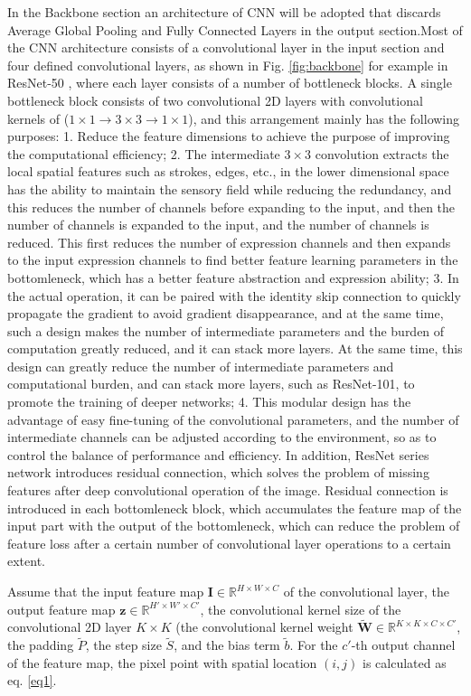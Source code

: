 In the Backbone section an architecture of CNN will be adopted that discards Average Global Pooling and Fully Connected Layers in the output section.Most of the CNN architecture consists of a convolutional layer in the input section and four defined convolutional layers, as shown in Fig. \ref{fig:backbone} for example in ResNet-50 \cite{14}, where each layer consists of a number of bottleneck blocks. A single bottleneck block consists of two convolutional 2D layers with convolutional kernels of ($1\times 1 \to 3\times 3 \to 1\times 1$), and this arrangement mainly has the following purposes: 1. Reduce the feature dimensions to achieve the purpose of improving the computational efficiency; 2. The intermediate $3\times 3$ convolution extracts the local spatial features such as strokes, edges, etc., in the lower dimensional space has the ability to maintain the sensory field while reducing the redundancy, and this reduces the number of channels before expanding to the input, and then the number of channels is expanded to the input, and the number of channels is reduced. This first reduces the number of expression channels and then expands to the input expression channels to find better feature learning parameters in the bottomleneck, which has a better feature abstraction and expression ability; 3. In the actual operation, it can be paired with the identity skip connection to quickly propagate the gradient to avoid gradient disappearance, and at the same time, such a design makes the number of intermediate parameters and the burden of computation greatly reduced, and it can stack more layers. At the same time, this design can greatly reduce the number of intermediate parameters and computational burden, and can stack more layers, such as ResNet-101, to promote the training of deeper networks; 4. This modular design has the advantage of easy fine-tuning of the convolutional parameters, and the number of intermediate channels can be adjusted according to the environment, so as to control the balance of performance and efficiency. In addition, ResNet series network introduces residual connection, which solves the problem of missing features after deep convolutional operation of the image. Residual connection is introduced in each bottomleneck block, which accumulates the feature map of the input part with the output of the bottomleneck, which can reduce the problem of feature loss after a certain number of convolutional layer operations to a certain extent.

Assume that the input feature map $ \mathbf{I} \in \mathbb{ R }^{ H\times W\times C } $ of the convolutional layer, the output feature map $\boldsymbol{z} \in \mathbb{ R }^{ H'\times W'\times C' }$, the convolutional kernel size of the convolutional 2D layer $K\times K$ (the convolutional kernel weight $ \tilde{\mathbf{W}} \in \mathbb{ R }^{ K\times K\times C\times C' } $, the padding $\tilde{P}$, the step size $\tilde{S}$, and the bias term $\tilde{b}$. For the $c'$-th output channel of the feature map, the pixel point with spatial location $(i,j)$ is calculated as eq. \ref{eq1}.

